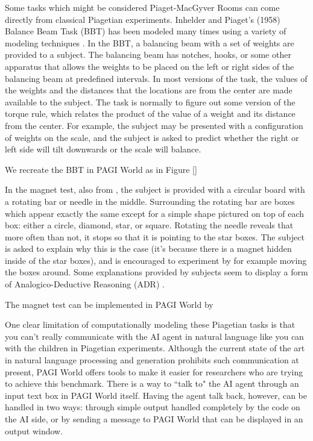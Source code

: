 Some tasks which might be considered Piaget-MacGyver Rooms can come directly from classical Piagetian experiments. Inhelder and Piaget's (1958) Balance Beam Task (BBT) \cite{Inhelder1958} has been modeled many times using a variety of modeling techniques \cite{Wilkening1982,Sage1983,Shultz1994,Schmidt1996,Turner2002,Licato2012}. In the BBT, a balancing beam with a set of weights are provided to a subject. The balancing beam has notches, hooks, or some other apparatus that allows the weights to be placed on the left or right sides of the balancing beam at predefined intervals. In most versions of the task, the values of the weights and the distances that the locations are from the center are made available to the subject. The task is normally to figure out some version of the torque rule, which relates the product of the value of a weight and its distance from the center. For example, the subject may be presented with a configuration of weights on the scale, and the subject is asked to predict whether the right or left side will tilt downwards or the scale will balance.

We recreate the BBT in PAGI World as in Figure \ref{} %

In the magnet test, also from \cite{Inhelder1958}, the subject is provided with a circular board with a rotating bar or needle in the middle. Surrounding the rotating bar are boxes which appear exactly the same except for a simple shape pictured on top of each box: either a circle, diamond, star, or square. Rotating the needle reveals that more often than not, it stops so that it is pointing to the star boxes. The subject is asked to explain why this is the case (it's because there is a magnet hidden inside of the star boxes), and is encouraged to experiment by for example moving the boxes around. Some explanations provided by subjects seem to display a form of Analogico-Deductive Reasoning (ADR) \cite{Bringsjord2012}.

The magnet test can be implemented in PAGI World by %

One clear limitation of computationally modeling these Piagetian tasks is that you can't really communicate with the AI agent in natural language like you can with the children in Piagetian experiments. Although the current state of the art in natural language processing and generation prohibits such communication at present, PAGI World offers tools to make it easier for researchers who are trying to achieve this benchmark. There is a way to ``talk to" the AI agent through an input text box in PAGI World itself. Having the agent talk back, however, can be handled in two ways: through simple output handled completely by the code on the AI side, or by sending a message to PAGI World that can be displayed in an output window.

